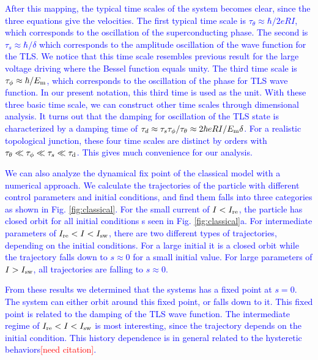 \documentclass[aps,prl,twocolumn,showpacs,showpacs,10pt,superscriptaddress]{revtex4-1}
\newcommand{\red}[1]{\textcolor{red}{#1}}
\newcommand{\blue}[1]{\textcolor{blue}{#1}}
\begin{document}
\blue{After this mapping, the typical time scales of the system becomes clear, since the three equations give the velocities. The first typical time scale is $\tau_\theta \approx \hbar/2eRI$, which corresponds to the oscillation of the superconducting phase. The second is $\tau_s \approx \hbar/\delta$ which corresponds to the amplitude oscillation of the wave function for the TLS. We notice that this time scale resembles previous result for the large voltage driving where the Bessel function equals unity. The third time scale is $\tau_\phi \approx \hbar/E_{\rm m}$, which corresponds to the oscillation of the phase for TLS wave function. In our present notation, this third time is used as the unit. With these three basic time scale, we can construct other time scales through dimensional analysis. It turns out that the damping for oscillation of the TLS state is characterized by a damping time of $\tau_d \approx \tau_s \tau_\phi / \tau_\theta \approx 2 \hbar eRI /E_{\rm m} \delta$. For a realistic topological junction, these four time scales are distinct by orders with $\tau_\theta \ll \tau_\phi \ll \tau_s \ll \tau_{\rm d}$. This gives much convenience for our analysis. }


\blue{
We can also analyze the dynamical fix point of the classical model with a numerical approach. We calculate the trajectories of the particle with different control parameters and initial conditions, and find them falls into three categories as shown in Fig. \ref{fig:classical}. For the small current of $I< I_{\rm re}$, the particle has closed orbit for all initial conditions s seen in Fig. \ref{fig:classical}a. For intermediate parameters of $I_{\rm re}<I<I_{\rm sw}$, there are two different types of trajectories, depending on the initial conditions. For a large initial it is a closed orbit while the trajectory falls down to $s \approx 0$ for a small initial value. For large parameters of $I> I_{\rm sw}$, all trajectories are falling to $s \approx 0$.}

\blue{From these results we determined that the systems has a fixed point at $s=0$. The system can either orbit around this fixed point, or falls down to it. This fixed point is related to the damping of the TLS wave function.
The intermediate regime of  $I_{\rm re} <I<I_{\rm sw}$ is most interesting, since the trajectory depends on the initial condition. This history dependence is in general related to the hysteretic behaviors\red{[need citation]}.}
\end{document}
